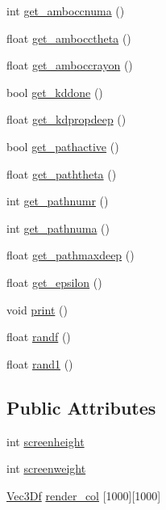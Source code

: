 \begin{DoxyCompactItemize}
\item 
int \hyperlink{class_parametres_a19da565d9d264a24ad2201efae989dc1}{get\_\-amboccnuma} ()
\item 
float \hyperlink{class_parametres_a2337c8b33e63313c93bf41fdc7aaa93b}{get\_\-ambocctheta} ()
\item 
float \hyperlink{class_parametres_a312a7325db6de52c0e541359021677be}{get\_\-amboccrayon} ()
\item 
bool \hyperlink{class_parametres_a1f1a91d29699a92b3e7d1c77092d28dc}{get\_\-kddone} ()
\item 
float \hyperlink{class_parametres_a3b699b59ed367aa62666ed0c7637735e}{get\_\-kdpropdeep} ()
\item 
bool \hyperlink{class_parametres_a8e7949eba0bad092780e12fd8a130910}{get\_\-pathactive} ()
\item 
float \hyperlink{class_parametres_a2b96600e3d2422fd48aabaded43ece22}{get\_\-paththeta} ()
\item 
int \hyperlink{class_parametres_ad7b3482fe5afd3575bc2617c2c6dbe6c}{get\_\-pathnumr} ()
\item 
int \hyperlink{class_parametres_a9a46269a028a5b44a01cebcf5a97452a}{get\_\-pathnuma} ()
\item 
float \hyperlink{class_parametres_a6add96f7906219121944a60e297e6dc8}{get\_\-pathmaxdeep} ()
\item 
float \hyperlink{class_parametres_a7af9392cc0faf43820fd1a2cb6aee9c7}{get\_\-epsilon} ()
\item 
void \hyperlink{class_parametres_abee627ef4465381952390cba771ff6b4}{print} ()
\item 
float \hyperlink{class_parametres_abb4433de2cf4af2ed4fd5acf7df0cfe7}{randf} ()
\item 
float \hyperlink{class_parametres_aac8d969901d37f2ce874afc22dbf1575}{rand1} ()
\end{DoxyCompactItemize}
\subsection*{Public Attributes}
\begin{DoxyCompactItemize}
\item 
int \hyperlink{class_parametres_a662b45f0f2015742a2daf370842f760c}{screenheight}
\item 
int \hyperlink{class_parametres_a27f7c42bbf966d9f0752c8462d246c1e}{screenweight}
\item 
\hyperlink{class_vec3_d}{Vec3Df} \hyperlink{class_parametres_a279a98495f098f4705ad95bbe9c02654}{render\_\-col} \mbox{[}1000\mbox{]}\mbox{[}1000\mbox{]}
\end{DoxyCompactItemize}


